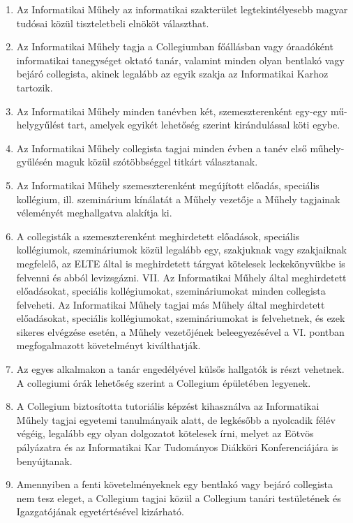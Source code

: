 \documentclass{../styles/rulebook}
\begin{document}
\begin{enumerate}
	\item Az Informatikai Műhely az informatikai szakterület legtekintélyesebb magyar tudósai közül tiszteletbeli elnököt választhat.
	\item Az Informatikai Műhely tagja a Collegiumban főállásban vagy óraadóként informatikai tanegységet oktató tanár, valamint minden olyan bentlakó vagy bejáró collegista, akinek legalább az egyik szakja az Informatikai Karhoz tartozik.
	\item Az Informatikai Műhely minden tanévben két, szemeszterenként egy-egy mű-helygyűlést tart, amelyek egyikét lehetőség szerint kirándulással köti egybe.
	\item Az Informatikai Műhely collegista tagjai minden évben a tanév első műhely-gyűlésén maguk közül szótöbbséggel titkárt választanak.
	\item Az Informatikai Műhely szemeszterenként megújított előadás, speciális kollégium, ill. szeminárium kínálatát a Műhely vezetője a Műhely tagjainak véleményét meghallgatva alakítja ki.
	\item A collegisták a szemeszterenként meghirdetett előadások, speciális kollégiumok, szemináriumok közül legalább egy, szakjuknak vagy szakjaiknak megfelelő, az ELTE által is meghirdetett tárgyat kötelesek leckekönyvükbe is felvenni és abból levizsgázni. VII. Az Informatikai Műhely által meghirdetett előadásokat, speciális kollégiumokat, szemináriumokat minden collegista felveheti. Az Informatikai Műhely tagjai más Műhely által meghirdetett előadásokat, speciális kollégiumokat, szemináriumokat is felvehetnek, és ezek sikeres elvégzése esetén, a Műhely vezetőjének beleegyezésével a VI. pontban megfogalmazott követelményt kiválthatják.
	\item Az egyes alkalmakon a tanár engedélyével külsős hallgatók is részt vehetnek. A collegiumi órák lehetőség szerint a Collegium épületében legyenek.
	\item A Collegium biztosította tutoriális képzést kihasználva az Informatikai Műhely tagjai egyetemi tanulmányaik alatt, de legkésőbb a nyolcadik félév végéig, legalább egy olyan dolgozatot kötelesek írni, melyet az Eötvös pályázatra és az Informatikai Kar Tudományos Diákköri Konferenciájára is benyújtanak.
	\item Amennyiben a fenti követelményeknek egy bentlakó vagy bejáró collegista nem tesz eleget, a Collegium tagjai közül a Collegium tanári testületének és Igazgatójának egyetértésével kizárható.
\end{enumerate}
\end{document}
